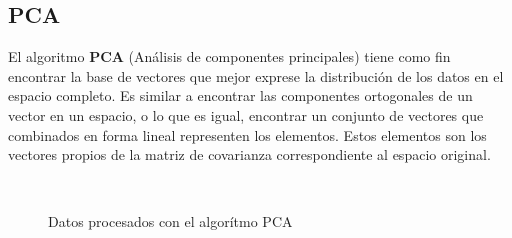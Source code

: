 \documentclass[12pt,a4paper,titlepage]{report}
\begin{document}
\subsection{PCA}

El algoritmo \textbf{PCA} (Análisis de componentes principales) tiene como fin encontrar la base de vectores que mejor exprese la distribución de los datos en el espacio completo. Es similar a encontrar las componentes ortogonales de un vector en un espacio, o lo que es igual, encontrar un conjunto de vectores que combinados en forma lineal representen los elementos. Estos elementos son los vectores propios de la matriz de covarianza correspondiente al espacio original.\\


\begin{figure} [H]
\centering
   \\
  \caption{Datos procesados con el algorítmo PCA} 
  \label{pcas}
\end{figure}
\end{document}

